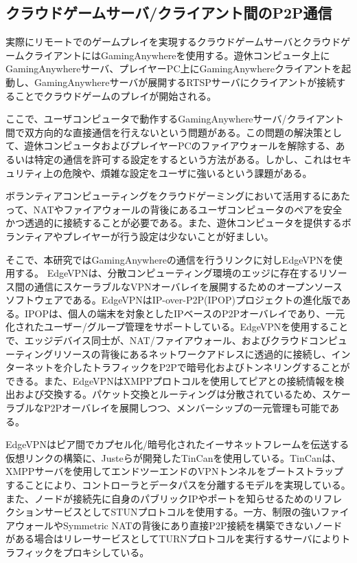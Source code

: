 \subsection{クラウドゲームサーバ/クライアント間のP2P通信}
実際にリモートでのゲームプレイを実現するクラウドゲームサーバとクラウドゲームクライアントにはGamingAnywhereを使用する。遊休コンピュータ上にGamingAnywhereサーバ、プレイヤーPC上にGamingAnywhereクライアントを起動し、GamingAnywhereサーバが展開するRTSPサーバにクライアントが接続することでクラウドゲームのプレイが開始される。

ここで、ユーザコンピュータで動作するGamingAnywhereサーバ/クライアント間で双方向的な直接通信を行えないという問題がある。この問題の解決策として、遊休コンピュータおよびプレイヤーPCのファイアウォールを解除する、あるいは特定の通信を許可する設定をするという方法がある。しかし、これはセキュリティ上の危険や、煩雑な設定をユーザに強いるという課題がある。

ボランティアコンピューティングをクラウドゲーミングにおいて活用するにあたって、NATやファイアウォールの背後にあるユーザコンピュータのペアを安全かつ透過的に接続することが必要である。また、遊休コンピュータを提供するボランティアやプレイヤーが行う設定は少ないことが好ましい。

そこで、本研究ではGamingAnywhereの通信を行うリンクに対しEdgeVPN\cite{edgevpn}を使用する。
EdgeVPNは、分散コンピューティング環境のエッジに存在するリソース間の通信にスケーラブルなVPNオーバレイを展開するためのオープンソースソフトウェアである。EdgeVPNはIP-over-P2P(IPOP)プロジェクト\cite{ipop}の進化版である。IPOPは、個人の端末を対象としたIPベースのP2Pオーバレイであり、一元化されたユーザー/グループ管理をサポートしている。EdgeVPNを使用することで、エッジデバイス同士が、NAT/ファイアウォール、およびクラウドコンピューティングリソースの背後にあるネットワークアドレスに透過的に接続し、インターネットを介したトラフィックをP2Pで暗号化およびトンネリングすることができる。また、EdgeVPNはXMPPプロトコル\cite{xmpp}を使用してピアとの接続情報を検出および交換する。パケット交換とルーティングは分散されているため、スケーラブルなP2Pオーバレイを展開しつつ、メンバーシップの一元管理も可能である。

EdgeVPNはピア間でカプセル化/暗号化されたイーサネットフレームを伝送する仮想リンクの構築に、Justeら\cite{tincan}が開発したTinCanを使用している。TinCanは、XMPPサーバを使用してエンドツーエンドのVPNトンネルをブートストラップすることにより、コントローラとデータパスを分離するモデルを実現している。また、ノードが接続先に自身のパブリックIPやポートを知らせるためのリフレクションサービスとしてSTUNプロトコル\cite{stun}を使用する。一方、制限の強いファイアウォールやSymmetric NATの背後にあり直接P2P接続を構築できないノードがある場合はリレーサービスとしてTURNプロトコル\cite{turn}を実行するサーバによりトラフィックをプロキシしている。

